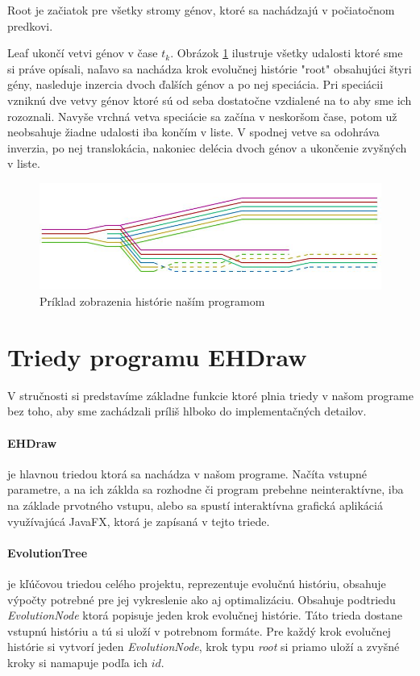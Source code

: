 Root je začiatok pre všetky stromy génov, ktoré sa nachádzajú v počiatočnom predkovi.

Leaf ukončí vetvi génov v čase $t_k$.\newline
Obrázok \ref{obr:events} ilustruje všetky udalosti ktoré sme si práve opísali, naľavo sa nachádza krok evolučnej histórie "root" obsahujúci štyri gény,
nasleduje inzercia dvoch ďalších génov a po nej speciácia. Pri speciácii vzniknú dve vetvy génov ktoré sú od seba dostatočne vzdialené na to aby sme ich rozoznali.
Navyše vrchná vetva speciácie sa začína v neskoršom čase, potom už neobsahuje žiadne udalosti iba končím v liste.
V spodnej vetve sa odohráva inverzia, po nej translokácia, nakoniec delécia dvoch génov a ukončenie zvyšných v liste.
\begin{figure}
\centerline{\includegraphics[width=1\textwidth]{images/udalosti}}
\caption{Príklad zobrazenia histórie naším programom}\label{obr:events}
\end{figure}
\section{Triedy programu EHDraw}
V stručnosti si predstavíme základne funkcie ktoré plnia triedy v našom programe bez toho, aby sme zachádzali príliš hlboko do implementačných detailov.
\paragraph{EHDraw} je hlavnou triedou ktorá sa nachádza v našom programe.
Načíta vstupné parametre, a na ich záklda sa rozhodne či program prebehne neinteraktívne, iba na základe prvotného vstupu, 
alebo sa spustí interaktívna grafická aplikáciá využívajúcá JavaFX, ktorá je zapísaná v tejto triede.
\paragraph{EvolutionTree} je kľúčovou triedou celého projektu, reprezentuje evolučnú históriu, obsahuje výpočty potrebné pre jej vykreslenie ako aj optimalizáciu. Obsahuje podtriedu \emph{EvolutionNode} 
ktorá popisuje jeden krok evolučnej histórie. Táto trieda dostane vstupnú históriu a tú si uloží v potrebnom formáte.
Pre každý krok evolučnej histórie si vytvorí jeden \emph{EvolutionNode}, krok typu \emph{root} si priamo uloží a zvyšné kroky si namapuje podľa ich $id$.

